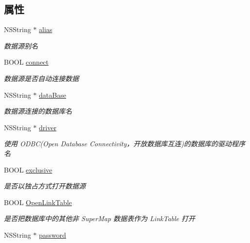 \subsection*{属性}
\begin{DoxyCompactItemize}
\item 
N\-S\-String $\ast$ \hyperlink{interface_datasource_connection_info_a1fd8ccb6acf54c051fa97a331b8e69b6}{alias}
\begin{DoxyCompactList}\small\item\em 数据源别名 \end{DoxyCompactList}\item 
B\-O\-O\-L \hyperlink{interface_datasource_connection_info_ac95c795a9273e09670a35298b89035ae}{connect}
\begin{DoxyCompactList}\small\item\em 数据源是否自动连接数据 \end{DoxyCompactList}\item 
N\-S\-String $\ast$ \hyperlink{interface_datasource_connection_info_a772012bcbe3ad652f6f30deff2d5524c}{data\-Base}
\begin{DoxyCompactList}\small\item\em 数据源连接的数据库名 \end{DoxyCompactList}\item 
N\-S\-String $\ast$ \hyperlink{interface_datasource_connection_info_aff2ec2a3b3bd1f02095f5a33f3b731a6}{driver}
\begin{DoxyCompactList}\small\item\em 使用 O\-D\-B\-C(Open Database Connectivity，开放数据库互连)的数据库的驱动程序名 \end{DoxyCompactList}\item 
B\-O\-O\-L \hyperlink{interface_datasource_connection_info_a15eaa8dfeb1d855e6fec2f9e6ff9820c}{exclusive}
\begin{DoxyCompactList}\small\item\em 是否以独占方式打开数据源 \end{DoxyCompactList}\item 
B\-O\-O\-L \hyperlink{interface_datasource_connection_info_aee6b9e9896d111f150c391a42ff95d16}{Open\-Link\-Table}
\begin{DoxyCompactList}\small\item\em 是否把数据库中的其他非 Super\-Map 数据表作为 Link\-Table 打开 \end{DoxyCompactList}\item 
N\-S\-String $\ast$ \hyperlink{interface_datasource_connection_info_ac2b82870737e9e1e4557e8f8a164b2cd}{password}

\end{DoxyCompactItemize}
